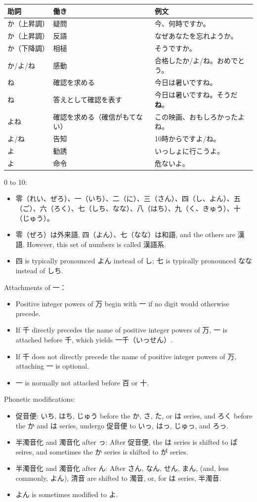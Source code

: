 \documentclass[a4paper,12pt]{article}
\begin{document}
\begin{longtable}[c]{|C{0.15\textwidth}|C{0.35\textwidth}|C{0.35\textwidth}|}
\hline
助詞 & 働き & 例文 \\\hline\endhead
か（上昇調） & 疑問 & 今、何時ですか。 \\\hline
か（上昇調） & 反語 & なぜあなたを忘れようか。 \\\hline
か（下降調） & 相槌 & そうですか。 \\\hline
か/よ/ね & 感動 & 合格したか/よ/ね。おめでとう。 \\\hline
ね & 確認を求める & 今日は暑いですね。 \\\hline
ね & 答えとして確認を表す & 今日は暑いですね。そうだ\textbf{ね}。 \\\hline
よね & 確認を求める（確信がもてない） & この映画、おもしろかったよね。 \\\hline
よ/ね & 告知 & 10時からですよ/ね。 \\\hline
よ & 勧誘 & いっしょに行こうよ。 \\\hline
よ & 命令 & 危ないよ。 \\\hline
\end{longtable}
0 to 10:
\begin{itemize}
\item 零（れい、ぜろ）、一（いち）、二（に）、三（さん）、四（し、よん）、五（ご）、六（ろく）、七（しち、なな）、八（はち）、九（く、きゅう）、十（じゅう）。
\item 零（ぜろ）は外来語, 四（よん）、七（なな）は和語, and the others are 漢語. However, this set of numbers is called 漢語系.
\item 四 is typically pronounced よん instead of し; 七 is typically pronounced なな instead of しち.
\end{itemize}
Attachments of 一：
\begin{itemize}
\item Positive integer powers of 万 begin with 一 if no digit would otherwise precede.
\item If 千 directly precedes the name of positive integer powers of 万, 一 is attached before 千, which yields 一千（いっせん）.
\item If 千 does not directly precede the name of positive integer powers of 万, attaching 一 is optional.
\item 一 is normally not attached before 百 or 十.
\end{itemize}
Phonetic modifications:
\begin{itemize}
\item 促音便: いち, はち, じゅう before the か, さ, た, or は series, and ろく before the か and は series, undergo 促音便 to いっ, はっ, じゅっ, and ろっ.
\item 半濁音化 and 濁音化 after っ: After 促音便, the は series is shifted to ぱ seires, and sometimes the か series is shifted to が series.
\item 半濁音化 and 濁音化 after ん: After さん, なん, せん, まん, (and, less commonly, よん), 清音 are shifted to 濁音, or, for は series, 半濁音.
\item よん is sometimes modified to よ.
\end{itemize}
\end{document}
